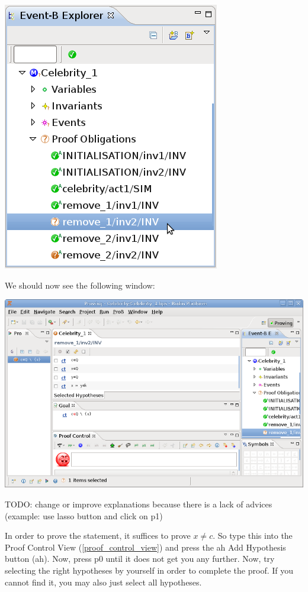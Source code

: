 \begin{center}
	\includegraphics{img/tutorial/tut_08_proof1.png}
\end{center}

We should now see the following window:

\begin{center}
	\includegraphics{img/tutorial/tut_08_proof2.png}
\end{center}


TODO: change or improve explanations because there is a lack of advices (example: use lasso button and click on p1)

In order to prove the statement, it suffices to prove \textsf{$x \neq c$}. So type this into the \textsf{Proof Control View} (\ref{proof_control_view}) and press the ah \textsf{Add Hypothesis button (ah)}. Now, press \textsf{p0} until it does not get you any further. Now, try selecting the right hypotheses by yourself in order to complete the proof. If you cannot find it, you may also just select all hypotheses.

